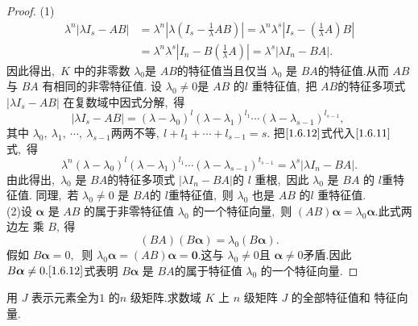 \begin{proof}
	(1)
	\begin{equation}
		\begin{aligned}
			\lambda^{n}\left|\lambda I_{s}-A B\right| & =\lambda^{n}\left|\lambda\left(I_{s}-\frac{1}{\lambda} A B\right)\right|=\lambda^{n} \lambda^{s}\left|I_{s}-\left(\frac{1}{\lambda} A\right) B\right| \\
			& =\lambda^{n} \lambda^{s}\left|I_{n}-B\left(\frac{1}{\lambda} A\right)\right|=\lambda^{s}\left|\lambda I_{n}-B A\right| .\label{1.6.11}
		\end{aligned}
	\end{equation}
	因此得出,\ $  K $ 中的非零数 $ \lambda_{0}  $是 $ A B  $的特征值当且仅当  $\lambda_{0}$  是 $ B A  $的特征值.从而 $ A B$  与 $ B A $ 有相同的非零特征值.
	设  $\lambda_{0} \neq 0  $是  $A B $ 的$  l $ 重特征值,\  把 $ A B  $的特征多项式  $\left|\lambda I_{s}-A B\right| $ 在复数域中因式分解,\  得
	\begin{equation}
		\left|\lambda I_{s}-A B\right|=\left(\lambda-\lambda_{0}\right)^{l}\left(\lambda-\lambda_{1}\right)^{l_{1}} \cdots\left(\lambda-\lambda_{s-1}\right)^{l_{s-1}} ,\ \label{1.6.12}
	\end{equation}
	其中 $ \lambda_{0},\  \lambda_{1},\  \cdots,\  \lambda_{s-1}  两两不等,\   l+l_{1}+\cdots+l_{s-1}=s.$
	把$\eqref{1.6.12}$式代入$\eqref{1.6.11}$式,\  得
	$$\lambda^{n}\left(\lambda-\lambda_{0}\right)^{l}\left(\lambda-\lambda_{1}\right)^{l_{1}} \cdots\left(\lambda-\lambda_{s-1}\right)^{t_{s-1}}=\lambda^{s}\left|\lambda I_{n}-B A\right| .$$
	由此得出,\  $ \lambda_{0}$  是 $ B A  $的特征多项式  $\left|\lambda I_{n}-B A\right|  $的  $l $ 重根,\  因此 $ \lambda_{0}$  是 $ B A $ 的 $ l  $重特征值.
	同理,\ 若 $ \lambda_{0} \neq 0 $ 是 $ B A  $的 $ l  $重特征值,\ 则 $ \lambda_{0}$  也是  $A B$  的$  l$  重特征值.\\
	(2)设  $\boldsymbol{\alpha}$  是 $ A B $ 的属于非零特征值  $\lambda_{0} $ 的一个特征向量,\  则 $ (A B) \boldsymbol{\alpha}=\lambda_{0} \boldsymbol{\alpha} .$此式两边左 乘  $B ,\  $得
	$$(B A)(B \boldsymbol{\alpha})=\lambda_{0}(B \boldsymbol{\alpha}).$$
	假如 $ B \boldsymbol{\alpha}=0 ,\ $ 则 $ \lambda_{0} \boldsymbol{\alpha}=(A B) \boldsymbol{\alpha}=\mathbf{0}  .$这与 $ \lambda_{0} \neq 0  $且  $\boldsymbol{\alpha} \neq 0  $矛盾.因此 $ B \boldsymbol{\alpha} \neq 0.\eqref{1.6.12}$式表明  $B \boldsymbol{\alpha} $ 是 $ B A  $的属于特征值  $\lambda_{0}$  的一个特征向量.
\end{proof}
\newpage
\begin{problem}
	用  $J $ 表示元素全为$ 1$ 的$  n $ 级矩阵.求数域  $K $ 上 $ n$  级矩阵 $ J $ 的全部特征值和 特征向量.
\end{problem}
